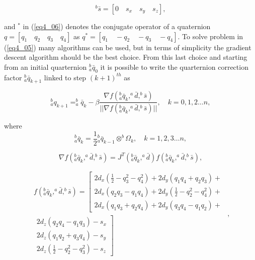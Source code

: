 \begin{equation}
\label{eq4_09}
^b \bar{s} = [0 \quad s_x \quad s_y \quad s_z],
\end{equation}

\noindent and $^{*}$ in (\ref{eq4_06}) denotes the conjugate operator of a quaternion $q = [q_1 \quad q_2 \quad q_3 \quad q_4]$ as $q^* = [q_1 \quad -q_2 \quad -q_3 \quad -q_4]$. To solve problem in (\ref{eq4_05}) many algorithms can be used, but in terms of simplicity the gradient descent algorithm should be the best choice. From this last choice and starting from an initial quarternion $^b_a \bar{q}_0$ it is possible to write the quarternion correction factor $^b_a \bar{q}_{k+1}$ linked to step $(k+1)^{th}$ as

\begin{equation}
\label{eq4_10}
^b_a q_{k+1} = ^b_a \bar{q}_k - \beta \frac{\nabla f(^b_a \bar{q}_k, ^a \bar{d}, ^b \bar{s})}{\vert \vert \nabla f(^b_a \bar{q}_k, ^a \bar{d}, ^b \bar{s}) \vert \vert}, \quad k = 0,1,2 \dots n,
\end{equation}

\noindent where 
\begin{equation}
\label{eq4_10bis}
^b_a \bar{q}_k = \frac{1}{2} {^b_a \bar{q}_{k-1}} \otimes ^b{\Omega_k},  \quad k = 1,2,3 \dots n,
\end{equation}

\begin{equation}
\label{eq4_11}
\nabla f(^b_a \bar{q}_k, ^a \bar{d}, ^b \bar{s}) = J^T(^b_a \bar{q}_k,^a \bar{d}) f(^b_a \bar{q}_k, ^a \bar{d}, ^b \bar{s}),
\end{equation}

\begin{equation}
\label{eq4_12}
\begin{split}
f(^b_a \bar{q}_k, ^a \bar{d}, ^b \bar{s}) = 
\left [ \begin{array}{c} 
2d_x(\frac{1}{2} - q_3^2 - q_4^2) + 2d_y(q_1q_4 + q_2 q_3) + \\ 
2d_x(q_2 q_3 - q_1 q_4) + 2d_y(\frac{1}{2} - q_2^2 - q_4^2) + \\ 
2d_x(q_1 q_3 + q_2 q_4) + 2d_y(q_3 q_4 - q_1 q_2) + \end{array} \right. \\
\left. \begin{array}{r}
2 d_z(q_2q_4 - q_1q_3) - s_x \\
2d_z(q_1q_2 + q_3 q_4) - s_y \\
2d_z(\frac{1}{2} - q_2^2 - q_3^2) - s_z  
\end{array} \right ] \end{split}, 
\end{equation}

